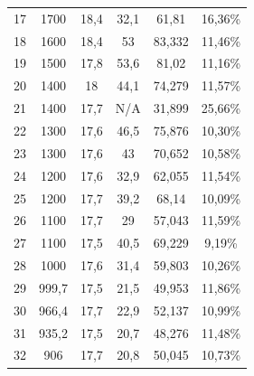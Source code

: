 \begin{longtable}[H]{cccccc}
  17          & 1700                 & 18,4          & 32,1           & 61,81         & 16,36\%                              \\
  18          & 1600                 & 18,4          & 53             & 83,332        & 11,46\%                              \\
  19          & 1500                 & 17,8          & 53,6           & 81,02         & 11,16\%                              \\
  20          & 1400                 & 18            & 44,1           & 74,279        & 11,57\%                              \\
  21          & 1400                 & 17,7          & N/A            & 31,899        & 25,66\%                              \\
  22          & 1300                 & 17,6          & 46,5           & 75,876        & 10,30\%                              \\
  23          & 1300                 & 17,6          & 43             & 70,652        & 10,58\%                              \\
  24          & 1200                 & 17,6          & 32,9           & 62,055        & 11,54\%                              \\
  25          & 1200                 & 17,7          & 39,2           & 68,14         & 10,09\%                              \\
  26          & 1100                 & 17,7          & 29             & 57,043        & 11,59\%                              \\
  27          & 1100                 & 17,5          & 40,5           & 69,229        & 9,19\%                               \\
  28          & 1000                 & 17,6          & 31,4           & 59,803        & 10,26\%                              \\
  29          & 999,7                & 17,5          & 21,5           & 49,953        & 11,86\%                              \\
  30          & 966,4                & 17,7          & 22,9           & 52,137        & 10,99\%                              \\
  31          & 935,2                & 17,5          & 20,7           & 48,276        & 11,48\%                              \\
  32          & 906                  & 17,7          & 20,8           & 50,045        & 10,73\%                              \\

\end{longtable}
